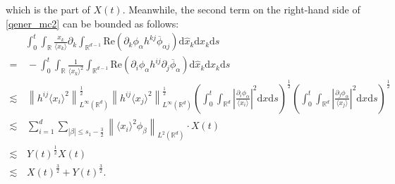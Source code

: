 \documentclass[10pt,twoside,a4paper]{article}
\numberwithin{equation}{section}\allowdisplaybreaks
\def\leq{\leqslant}
\begin{document}
which is the part of $ X(t). $
Meanwhile, the second term on the right-hand side of \eqref{qener_mc2} can be bounded as follows:
\begin{align*} 
	&\int_0^t\int_{\mathbb{R}}    	\frac{x_k}{\langle x_k\rangle}   \partial_k \int_{\mathbb{R}^{d-1}} \mathrm{Re}\left(\partial_k \phi_{\alpha } h^{kj} \overline{\phi}_{\alpha j}\right) \mathrm{d} \hat{x}_k  \mathrm{d} x_k \mathrm{d} s\nonumber\\
	=&\,-\int_0^t	\int_{\mathbb{R}}\frac{1}{\langle x_k\rangle^2}   \int_{\mathbb{R}^{d-1}}  \mathrm{Re}\left(\partial_{i} \phi_{\alpha }   h^{ij} \partial_j \overline{\phi}_{\alpha }\right) \mathrm{d} \hat{x}_k  \mathrm{d} x_k \mathrm{d} s\\
	\lesssim &\,\left\|  h^{ij}  \langle x_i\rangle^2 \right\|_{L^\infty(\mathbb{R}^d)}^{\frac{1}{2}}  \left\| h^{ij}  \langle x_j\rangle^2 \right\|_{L^\infty(\mathbb{R}^d)}^{\frac{1}{2}} \left(\int_0^t     \int_{\mathbb{R}^{d}} \left|\frac{\partial_i \phi_{\alpha }  } {\langle x_i\rangle}\right|^2  \mathrm{d} x \mathrm{d} s\right)^{\frac 12}   \left(\int_0^t     \int_{\mathbb{R}^{d}} \left|\frac{\partial_j \phi_{\alpha }  } {\langle x_j\rangle}\right|^2  \mathrm{d} x \mathrm{d} s\right)^{\frac 12}\nonumber\\
	\lesssim &\,\sum_{i=1}^d\sum_{|\beta| \leq s_1-\frac 32}\left\| \langle x_i\rangle^2 \phi_{\beta}\right\|_{L^2(\mathbb{R}^d)} \cdot X(t)\nonumber\\
	\lesssim &\,Y(t)^{\frac 12} X(t)\\
	\lesssim &\,X(t)^{\frac 32}+Y(t)^{\frac 32}.
\end{align*}
\end{document}

